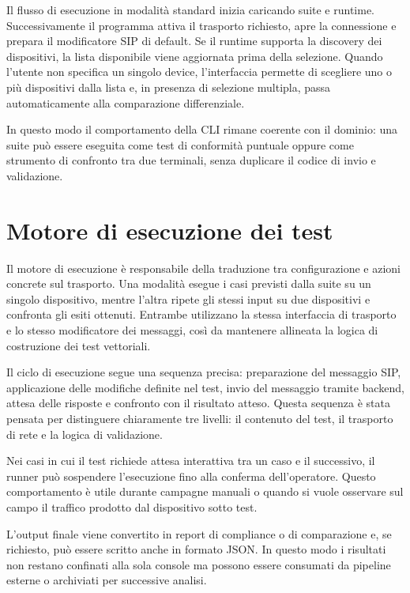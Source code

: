 Il flusso di esecuzione in modalit\`a standard inizia caricando suite e runtime. Successivamente il programma attiva il trasporto richiesto, apre la connessione e prepara il modificatore SIP di default. Se il runtime supporta la discovery dei dispositivi, la lista disponibile viene aggiornata prima della selezione. Quando l'utente non specifica un singolo device, l'interfaccia permette di scegliere uno o pi\`u dispositivi dalla lista e, in presenza di selezione multipla, passa automaticamente alla comparazione differenziale.

In questo modo il comportamento della CLI rimane coerente con il dominio: una suite pu\`o essere eseguita come test di conformit\`a puntuale oppure come strumento di confronto tra due terminali, senza duplicare il codice di invio e validazione.

\section{Motore di esecuzione dei test}

Il motore di esecuzione \`e responsabile della traduzione tra configurazione e azioni concrete sul trasporto. Una modalit\`a esegue i casi previsti dalla suite su un singolo dispositivo, mentre l'altra ripete gli stessi input su due dispositivi e confronta gli esiti ottenuti. Entrambe utilizzano la stessa interfaccia di trasporto e lo stesso modificatore dei messaggi, cos\`i da mantenere allineata la logica di costruzione dei test vettoriali.

Il ciclo di esecuzione segue una sequenza precisa: preparazione del messaggio SIP, applicazione delle modifiche definite nel test, invio del messaggio tramite backend, attesa delle risposte e confronto con il risultato atteso. Questa sequenza \`e stata pensata per distinguere chiaramente tre livelli: il contenuto del test, il trasporto di rete e la logica di validazione.

Nei casi in cui il test richiede attesa interattiva tra un caso e il successivo, il runner pu\`o sospendere l'esecuzione fino alla conferma dell'operatore. Questo comportamento \`e utile durante campagne manuali o quando si vuole osservare sul campo il traffico prodotto dal dispositivo sotto test.

L'output finale viene convertito in report di compliance o di comparazione e, se richiesto, pu\`o essere scritto anche in formato JSON. In questo modo i risultati non restano confinati alla sola console ma possono essere consumati da pipeline esterne o archiviati per successive analisi.

